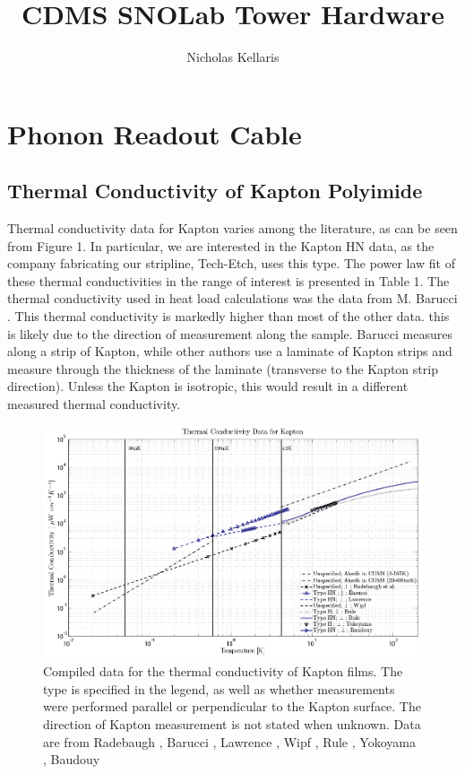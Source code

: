 \documentclass{article}
\title{CDMS SNOLab Tower Hardware}
\author{Nicholas Kellaris}
\begin{document}

\maketitle

\section{Phonon Readout Cable}

\subsection{Thermal Conductivity of Kapton Polyimide}

Thermal conductivity data for Kapton varies among the literature, as can be seen from Figure 1. In particular, we are interested in the Kapton HN data, as the company fabricating our stripline, Tech-Etch, uses this type. The power law fit of these thermal conductivities in the range of interest is presented in Table 1. The thermal conductivity used in heat load calculations was the data from M. Barucci \cite{bar}. This thermal conductivity is markedly higher than most of the other data. this is likely due to the direction of measurement along the sample. Barucci measures along a strip of Kapton, while other authors use a laminate of Kapton strips and measure through the thickness of the laminate (transverse to the Kapton strip direction). Unless the Kapton is isotropic, this would result in a different measured thermal conductivity.

\begin{figure}[h]
\includegraphics[width = .9\textwidth]{Kapton_var.png}
\caption{Compiled data for the thermal conductivity of Kapton films. The type is specified in the legend, as well as whether measurements were performed parallel or perpendicular to the Kapton surface. The direction of Kapton measurement is not stated when unknown. Data are from Radebaugh \cite{rad73}, Barucci \cite{bar}, Lawrence \cite{law}, Wipf \cite{wip}, Rule \cite{Rule1996}, Yokoyama \cite{yok}, Baudouy \cite{Baudouy2003} }
\end{figure}
\end{document}

